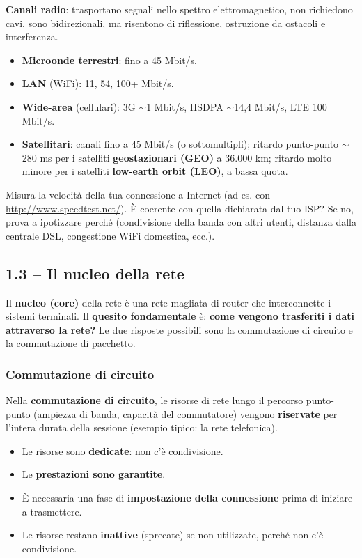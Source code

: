 \documentclass[12pt, a4paper]{article}
\begin{document}
\textbf{Canali radio}: trasportano segnali nello spettro elettromagnetico, non richiedono cavi, sono bidirezionali, ma risentono di riflessione, ostruzione da ostacoli e interferenza.
\begin{itemize}
    \item \textbf{Microonde terrestri}: fino a 45 Mbit/s.
    \item \textbf{LAN} (WiFi): 11, 54, 100+ Mbit/s.
    \item \textbf{Wide-area} (cellulari): 3G $\sim$1 Mbit/s, HSDPA $\sim$14,4 Mbit/s, LTE 100 Mbit/s.
    \item \textbf{Satellitari}: canali fino a 45 Mbit/s (o sottomultipli); ritardo punto-punto $\sim$280 ms per i satelliti \textbf{geostazionari (GEO)} a 36.000 km; ritardo molto minore per i satelliti \textbf{low-earth orbit (LEO)}, a bassa quota.
\end{itemize}

\begin{tcolorbox}[colback=orange!5, colframe=orange!70!black, title=\textbf{Esercizio pratico 1.1}]
Misura la velocità della tua connessione a Internet (ad es. con \url{http://www.speedtest.net/}). È coerente con quella dichiarata dal tuo ISP? Se no, prova a ipotizzare perché (condivisione della banda con altri utenti, distanza dalla centrale DSL, congestione WiFi domestica, ecc.).
\end{tcolorbox}

\subsection{1.3 -- Il nucleo della rete}

Il \textbf{nucleo (core)} della rete è una rete magliata di router che interconnette i sistemi terminali. Il \textbf{quesito fondamentale} è: \textbf{come vengono trasferiti i dati attraverso la rete?} Le due risposte possibili sono la commutazione di circuito e la commutazione di pacchetto.

\subsubsection{Commutazione di circuito}

Nella \textbf{commutazione di circuito}, le risorse di rete lungo il percorso punto-punto (ampiezza di banda, capacità del commutatore) vengono \textbf{riservate} per l'intera durata della sessione (esempio tipico: la rete telefonica).

\begin{itemize}
    \item Le risorse sono \textbf{dedicate}: non c'è condivisione.
    \item Le \textbf{prestazioni sono garantite}.
    \item È necessaria una fase di \textbf{impostazione della connessione} prima di iniziare a trasmettere.
    \item Le risorse restano \textbf{inattive} (sprecate) se non utilizzate, perché non c'è condivisione.
\end{itemize}
\end{document}
